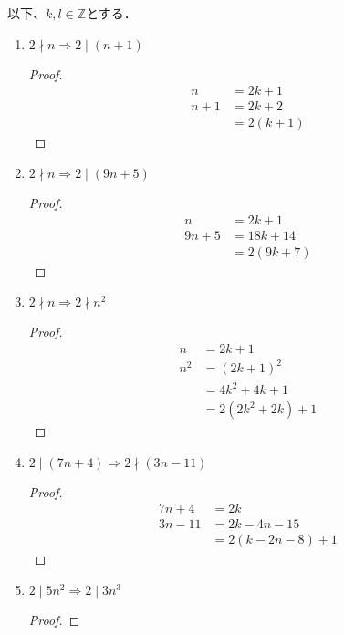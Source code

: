 \documentclass[a4paper,12pt]{ltjsarticle}
\begin{document}
\section{}
以下、$k,l \in \mathbb{Z}$とする．
\begin{enumerate}[(1)]
    \item $2 \nmid n \Rightarrow 2 \mid (n + 1)$
        \begin{proof}
            \begin{align*}
                n &= 2k + 1 \\
                n + 1 &= 2k + 2 \\
                &= 2(k + 1)
            \end{align*}
        \end{proof}
    \item $2 \nmid n \Rightarrow 2 \mid (9n + 5)$
        \begin{proof}
            \begin{align*}
                n &= 2k + 1 \\
                9n + 5 &= 18k + 14 \\
                &= 2(9k + 7)
            \end{align*}
        \end{proof}
    \item $2 \nmid n \Rightarrow 2 \nmid n^2$
        \begin{proof}
            \begin{align*}
                n &= 2k + 1 \\
                n^2 &= (2k + 1)^2 \\
                &= 4k^2 + 4k + 1 \\
                &= 2(2k^2 + 2k) + 1
            \end{align*}
        \end{proof}
    \item $2 \mid (7n + 4) \Rightarrow 2 \nmid (3n - 11)$
        \begin{proof}
            \begin{align*}
                7n + 4 &= 2k \\
                3n - 11 &= 2k - 4n - 15 \\
                &= 2(k - 2n - 8) + 1
            \end{align*}
        \end{proof}
    \item $2 \mid 5n^2 \Rightarrow 2 \mid 3n^3$
        \begin{proof}

\end{proof}
\end{enumerate}
\end{document}
